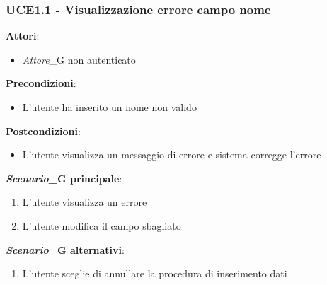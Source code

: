 \subsubsection{UCE1.1 - Visualizzazione errore campo nome}
\textbf{Attori}:
\begin{itemize}
    \item \textit{Attore}_G non autenticato
\end{itemize}
\textbf{Precondizioni}:
\begin{itemize}
    \item L'utente ha inserito un nome non valido
\end{itemize}
\textbf{Postcondizioni}:
\begin{itemize}
    \item L'utente visualizza un messaggio di errore e sistema corregge l'errore
\end{itemize}
\textbf{\textit{Scenario}_G principale}:
\begin{enumerate}
    \item L'utente visualizza un errore 
    \item L'utente modifica il campo sbagliato
\end{enumerate}
\textbf{\textit{Scenario}_G alternativi}:
\begin{enumerate}
    \item L'utente sceglie di annullare la procedura di inserimento dati
\end{enumerate}
